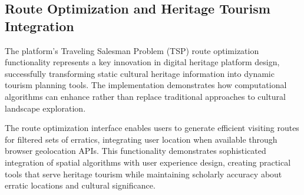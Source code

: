 
\subsection{Route Optimization and Heritage Tourism Integration}
\label{subsec:route_optimization_results}

The platform's Traveling Salesman Problem (TSP) route optimization functionality represents a key innovation in digital heritage platform design, successfully transforming static cultural heritage information into dynamic tourism planning tools. The implementation demonstrates how computational algorithms can enhance rather than replace traditional approaches to cultural landscape exploration.

The route optimization interface enables users to generate efficient visiting routes for filtered sets of erratics, integrating user location when available through browser geolocation APIs. This functionality demonstrates sophisticated integration of spatial algorithms with user experience design, creating practical tools that serve heritage tourism while maintaining scholarly accuracy about erratic locations and cultural significance.


